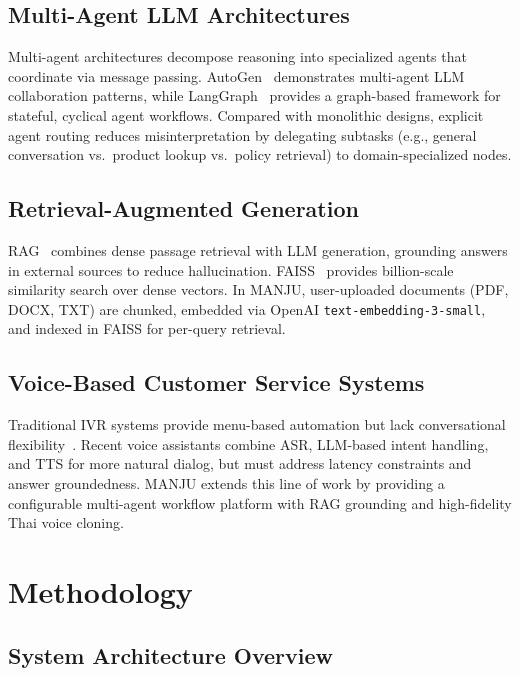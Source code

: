 \documentclass[10pt, a4paper, twocolumn]{article}
\begin{document}
\subsection{Multi-Agent LLM Architectures}
Multi-agent architectures decompose reasoning into specialized agents that coordinate via message passing.
AutoGen~\cite{wu2023autogen} demonstrates multi-agent LLM collaboration patterns, while LangGraph~\cite{langgraph2024} provides a graph-based framework for stateful, cyclical agent workflows.
Compared with monolithic designs, explicit agent routing reduces misinterpretation by delegating subtasks (e.g., general conversation vs.\ product lookup vs.\ policy retrieval) to domain-specialized nodes.

\subsection{Retrieval-Augmented Generation}
RAG~\cite{lewis2020rag} combines dense passage retrieval with LLM generation, grounding answers in external sources to reduce hallucination.
FAISS~\cite{johnson2019faiss} provides billion-scale similarity search over dense vectors.
In MANJU, user-uploaded documents (PDF, DOCX, TXT) are chunked, embedded via OpenAI \texttt{text-embedding-3-small}, and indexed in FAISS for per-query retrieval.

\subsection{Voice-Based Customer Service Systems}
Traditional IVR systems provide menu-based automation but lack conversational flexibility~\cite{gans2003callcenters}.
Recent voice assistants combine ASR, LLM-based intent handling, and TTS for more natural dialog, but must address latency constraints and answer groundedness.
MANJU extends this line of work by providing a configurable multi-agent workflow platform with RAG grounding and high-fidelity Thai voice cloning.

\section{Methodology}
\label{sec:methodology}

\subsection{System Architecture Overview}
\end{document}
